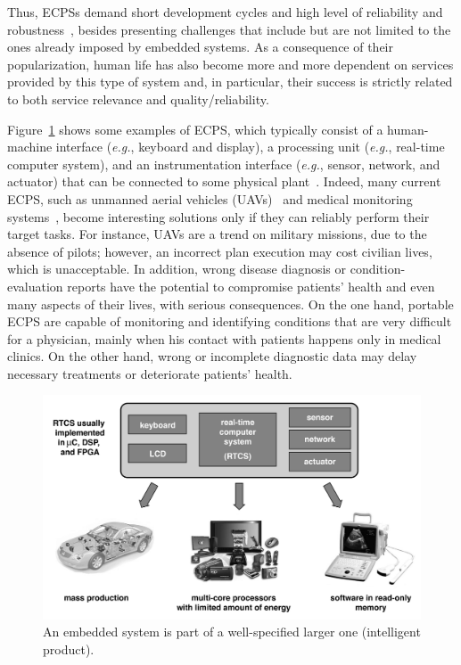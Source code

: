 \documentclass[format=acmsmall, review=false, screen=true]{acmart}
\begin{document}
Thus, ECPSs demand short development cycles and high level of reliability and robustness~\cite{leeCPS,leeCPS2}, besides presenting challenges that include but are not limited to the ones already imposed by embedded systems. As a consequence of their popularization, human life has also become more and more dependent on services provided by this type of system and, in particular, their success is strictly related to both service relevance and quality/reliability. 

Figure~\ref{intelligent-product} shows some examples of ECPS, which typically consist of a human-machine interface ({\it e.g.}, keyboard and display), a processing unit ({\it e.g.}, real-time computer system), and an instrumentation interface ({\it e.g.}, sensor, network, and actuator) that can be connected to some physical plant~\cite{Kopetz11}. Indeed, many current ECPS, such as unmanned aerial vehicles (UAVs)~\cite{groza2015formal} and medical monitoring systems~\cite{Cordeiro09}, become interesting solutions only if they can reliably perform their target tasks. For instance, UAVs are a trend on military missions, due to the absence of pilots; however, an incorrect plan execution may cost civilian lives, which is unacceptable. In addition, wrong disease diagnosis or condition-evaluation reports have the potential to compromise patients' health and even many aspects of their lives, with serious consequences. On the one hand, portable ECPS are capable of monitoring and identifying conditions that are very difficult for a physician, mainly when his contact with patients happens only in medical clinics. On the other hand, wrong or incomplete diagnostic data may delay necessary treatments or deteriorate patients' health. 
%
\begin{figure}[!t]
	\centering
	\includegraphics[scale=0.4]{figure1.jpg}
	\caption{An embedded system is part of a well-specified larger one (intelligent product).}
	\label{intelligent-product}
\end{figure}
\end{document}
